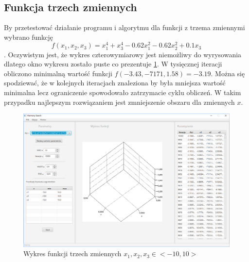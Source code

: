 \documentclass[10pt, a4paper]{article}
\begin{document}
\subsection{Funkcja trzech zmiennych}
\label{subsec:trzyzmienne}
By przetestować działanie programu i algorytmu dla funkcji z trzema zmiennymi wybrano funkcję $$f(x_{1},x_{2},x_{3}) = x_{1}^{4}+x_{3}^{4}-0.62x_{1}^{2}-0.62x_{2}^{2}+0.1x_{3}$$. Oczywistym jest, że wykres czterowymiarowy jest niemożliwy do wyrysowania dlatego okno wykresu zostało puste co prezentuje \ref{fig:41}. W tysięcznej iteracji obliczono minimalną wartość funkcji $f(-3.43,-7171,1.58)=-3.19$. Można się spodziewać, że w kolejnych iteracjach znaleziona by była mniejsza wartość minimalna lecz ograniczenie spowodowało zatrzymacie cyklu obliczeń. W takim przypadku najlepszym rozwiązaniem jest zmniejszenie obszaru dla zmiennych $x$.
\begin{figure}[htbp]
	\centering
	\includegraphics[width=.6\textwidth]{images/41.PNG}
	\caption{Wykres funkcji trzech zmiennych $x_{1}, x_{2}, x_{3} \in <-10,10>$}
	\label{fig:41}
\end{figure}
\end{document}

